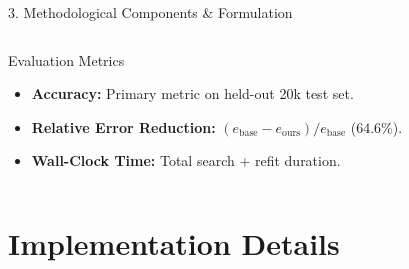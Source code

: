 \documentclass[aspectratio=169, 11pt]{beamer}
\begin{document}
\begin{frame}{3. Methodological Components \& Formulation}
\begin{columns}[T]
        \begin{block}{Evaluation Metrics}
            \scriptsize
            \begin{itemize}
                \setlength{\itemsep}{1pt}
                \item \textbf{Accuracy:} Primary metric on held-out 20k test set.
                \item \textbf{Relative Error Reduction:} $(e_{\text{base}} - e_{\text{ours}}) / e_{\text{base}}$ ($64.6\%$).
                \item \textbf{Wall-Clock Time:} Total search + refit duration.
            \end{itemize}
        \end{block}
    \end{columns}
\end{frame}

\section{Implementation Details}
\end{document}
